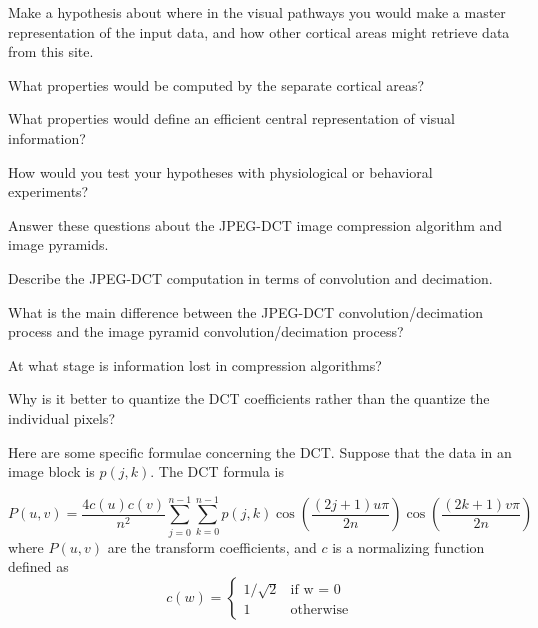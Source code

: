  \be

 \item Make a hypothesis about where in the visual pathways you would
make a master representation of the input data, and how other cortical
areas might retrieve data from this site.

 \item What properties would be computed by the separate cortical areas?

 \item What properties would define an efficient central
representation of visual information?

 \item How would you test your hypotheses with physiological or
behavioral experiments?

 \ee

\item Answer these questions about the JPEG-DCT image compression
algorithm and image pyramids.

 \be

 \item Describe the JPEG-DCT computation in terms of convolution and
decimation.

 \item What is the main difference between the JPEG-DCT convolution/decimation
process and the image pyramid convolution/decimation process?

 \item  At what stage is information lost in compression algorithms? 

 \item Why is it better to quantize the DCT coefficients rather than
the quantize the individual pixels?

 \ee

\item Here are some specific formulae concerning the DCT.
Suppose that the data in an image block is $p(j,k)$.  The DCT formula
is

\begin{equation}
P(u,v) =  
  \frac {4 c(u) c(v) }{ n ^ 2}
   \sum_{j = 0}^{n-1} 
     \sum_{k=0}^{n-1} p(j,k) 
       \cos ( \frac{(2j + 1) u \pi}{2n} ) \cos ( \frac{ (2k+1)v \pi}{2n} )
\label{e6:dct}
\end{equation}
where $P(u,v)$ are the transform coefficients, and $c$ is a
normalizing function defined as
\begin{equation}
c ( w  ) =  \left 
   \{ \begin{array}{ll} 
     { 1 / \sqrt{2} } & \mbox{if w = 0 } \\
     { 1 } & {\mbox{otherwise}}
    \end{array}
   \right.
\end{equation}

